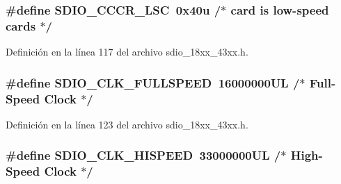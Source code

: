 \subsubsection[{\texorpdfstring{S\+D\+I\+O\+\_\+\+C\+C\+C\+R\+\_\+\+L\+SC}{SDIO_CCCR_LSC}}]{\setlength{\rightskip}{0pt plus 5cm}\#define S\+D\+I\+O\+\_\+\+C\+C\+C\+R\+\_\+\+L\+SC~0x40u		/$\ast$ card is low-\/speed cards $\ast$/}\hypertarget{group___s_d_i_o__18_x_x__43_x_x_gab1e79e46eaea4a43810230d107ed09da}{}\label{group___s_d_i_o__18_x_x__43_x_x_gab1e79e46eaea4a43810230d107ed09da}


Definición en la línea 117 del archivo sdio\+\_\+18xx\+\_\+43xx.\+h.

\subsubsection[{\texorpdfstring{S\+D\+I\+O\+\_\+\+C\+L\+K\+\_\+\+F\+U\+L\+L\+S\+P\+E\+ED}{SDIO_CLK_FULLSPEED}}]{\setlength{\rightskip}{0pt plus 5cm}\#define S\+D\+I\+O\+\_\+\+C\+L\+K\+\_\+\+F\+U\+L\+L\+S\+P\+E\+ED~16000000\+U\+L    /$\ast$ Full-\/\+Speed Clock	$\ast$/}\hypertarget{group___s_d_i_o__18_x_x__43_x_x_ga5a1465ced1676ff1c5dc92ebacfc52eb}{}\label{group___s_d_i_o__18_x_x__43_x_x_ga5a1465ced1676ff1c5dc92ebacfc52eb}


Definición en la línea 123 del archivo sdio\+\_\+18xx\+\_\+43xx.\+h.

\subsubsection[{\texorpdfstring{S\+D\+I\+O\+\_\+\+C\+L\+K\+\_\+\+H\+I\+S\+P\+E\+ED}{SDIO_CLK_HISPEED}}]{\setlength{\rightskip}{0pt plus 5cm}\#define S\+D\+I\+O\+\_\+\+C\+L\+K\+\_\+\+H\+I\+S\+P\+E\+ED~33000000\+U\+L    /$\ast$ High-\/\+Speed Clock	$\ast$/}\hypertarget{group___s_d_i_o__18_x_x__43_x_x_gaec2d2c3efcd5b586c08200fcde226286}{}\label{group___s_d_i_o__18_x_x__43_x_x_gaec2d2c3efcd5b586c08200fcde226286}


